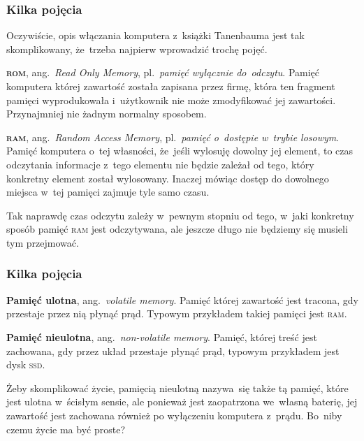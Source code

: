 \documentclass[10pt,t]{beamer}
\begin{document}
\begin{frame}
  \frametitle{Kilka pojęcia}


  Oczywiście, opis włączania komputera z~książki Tanenbauma jest tak
  skomplikowany, że~trzeba najpierw wprowadzić trochę pojęć.

  \textbf{\textsc{rom}}, ang.~\textit{Read Only Memory}, pl.~\textit{pamięć
    wyłącznie do~odczytu}. Pamięć komputera której zawartość została
  zapisana przez firmę, która ten fragment pamięci wyprodukowała
  i~użytkownik nie może zmodyfikować jej zawartości. Przynajmniej nie żadnym
  normalny sposobem.

  \textbf{\textsc{ram}}, ang.~\textit{Random Access Memory},
  pl.~\textit{pamięć o~dostępie w~trybie losowym}. Pamięć komputera o~tej
  własności, że~jeśli wylosuję dowolny jej element, to czas odczytania
  informacje z~tego elementu nie będzie zależał od tego, który konkretny
  element został wylosowany. Inaczej mówiąc dostęp do dowolnego miejsca
  w~tej pamięci zajmuje tyle samo czasu.

  Tak naprawdę czas odczytu zależy w~pewnym stopniu od tego, w~jaki
  konkretny sposób pamięć \textsc{ram} jest odczytywana, ale jeszcze długo
  nie będziemy się musieli tym przejmować.

\end{frame}





\begin{frame}
  \frametitle{Kilka pojęcia}


  \textbf{Pamięć ulotna}, ang.~\textit{volatile memory}. Pamięć której
  zawartość jest tracona, gdy przestaje przez nią płynąć prąd. Typowym
  przykładem takiej pamięci jest \textsc{ram}.

  \textbf{Pamięć nieulotna}, ang.~\textit{non-volatile memory}. Pamięć,
  której treść jest zachowana, gdy przez układ przestaje płynąć prąd,
  typowym przykładem jest dysk \textsc{ssd}.

  Żeby skomplikować życie, pamięcią nieulotną nazywa~się także tą pamięć,
  które jest ulotna w~ścisłym sensie, ale ponieważ jest zaopatrzona
  we~własną baterię, jej zawartość jest zachowana również po wyłączeniu
  komputera z~prądu. Bo~niby czemu życie ma być proste?

\end{frame}
\end{document}
